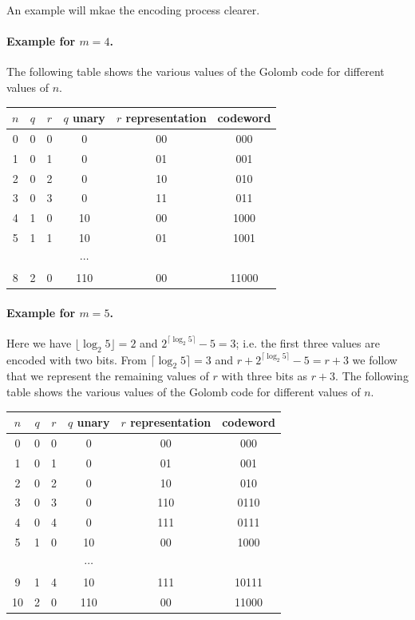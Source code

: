 An example will mkae the encoding process clearer.

\paragraph{Example for $m=4$.} The following table shows the various values of the Golomb code for different values of $n$.

\vspace*{3mm}

\begin{tabular}{c|cc|cc|c}
  $n$ & $q$ & $r$ & $q$ unary & $r$ representation & codeword \\ \hline
  0 & 0 & 0 & 0 & 00 & 000 \\
  1 & 0 & 1 & 0 & 01 & 001 \\
  2 & 0 & 2 & 0 & 10 & 010 \\
  3 & 0 & 3 & 0 & 11 & 011 \\
  4 & 1 & 0 & 10 & 00 & 1000 \\
  5 & 1 & 1 & 10 & 01 & 1001 \\
      & & & $\cdots$ & & \\
  8 & 2 & 0 & 110 & 00 & 11000
\end {tabular}
  
\vspace*{3mm}

\paragraph{Example for $m=5$.} Here we have $\lfloor \log_2 5 \rfloor = 2$ and $2^{\lceil \log_2 5 \rceil}  - 5 = 3$; i.e. the first three values are encoded with two bits. From $\lceil \log_2 5 \rceil = 3$ and $r + 2^{\lceil \log_2 5 \rceil} - 5 = r+3$ we follow that we represent the remaining values of $r$ with three bits as $r+3$. The following table shows the various values of the Golomb code for different values of $n$.

\vspace*{3mm}

\begin{tabular}{c|cc|cc|c}
  $n$ & $q$ & $r$ & $q$ unary & $r$ representation & codeword \\ \hline
  0 & 0 & 0 & 0 & 00 & 000 \\
  1 & 0 & 1 & 0 & 01 & 001 \\
  2 & 0 & 2 & 0 & 10 & 010 \\
  3 & 0 & 3 & 0 & 110 & 0110 \\
  4 & 0 & 4 & 0 & 111 & 0111 \\
  5 & 1 & 0 & 10 & 00 & 1000 \\
        & & & $\cdots$ & & \\
  9 & 1 & 4 & 10 & 111 & 10111 \\
  10 & 2 & 0 & 110 & 00 & 11000
\end {tabular}
  

